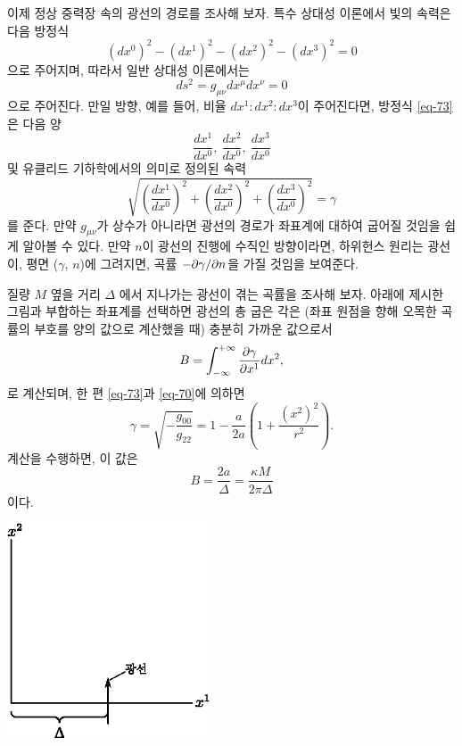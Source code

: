 \documentclass[b5paper]{article}
\begin{document}
이제 정상 중력장 속의 광선의 경로를 조사해 보자. 특수 상대성 이론에서 빛의 속력은 다음 방정식
\begin{equation*}
	\left(dx^0\right)^2-\left(dx^1\right)^2-\left(dx^2\right)^2-\left(dx^3\right)^2=0
\end{equation*}
으로 주어지며, 따라서 일반 상대성 이론에서는
\begin{equation} \label{eq-73}
	ds^2=g_{\mu\nu} dx^\mu dx^\nu = 0
\end{equation}
으로 주어진다. 만일 방향, 예를 들어, 비율 $dx^1 : dx^2 : dx^3$이 주어진다면, 방정식 \eqref{eq-73}은 다음 양
\begin{equation*}
	\frac{dx^1}{dx^0},~\frac{dx^2}{dx^0},~\frac{dx^3}{dx^0}
\end{equation*}
및 유클리드 기하학에서의 의미로 정의된 속력
\begin{equation*}
	\sqrt{\left(\frac{dx^1}{dx^0}\right)^2 + \left(\frac{dx^2}{dx^0}\right)^2 + \left(\frac{dx^3}{dx^0}\right)^2} =\gamma
\end{equation*}
를 준다. 만약 $g_{\mu\nu}$가 상수가 아니라면 광선의 경로가 좌표계에 대하여 굽어질 것임을 쉽게 알아볼 수 있다. 만약 $n$이 광선의 진행에 수직인 방향이라면, 하위헌스 원리는 광선이, 평면 ($\gamma$, $n$)에 그려지면, 곡률 $-{{{\partial}{\gamma}}/{{\partial}{n}}}$을 가질 것임을 보여준다.

질량 $M$ 옆을 거리 $\Delta$ 에서 지나가는 광선이 겪는  곡률을 조사해 보자. 아래에 제시한 그림과 부합하는 좌표계를 선택하면 광선의 총 굽은 각은 (좌표 원점을 향해 오목한 곡률의 부호를 양의 값으로 계산했을 때) 충분히 가까운 값으로서
\begin{equation*}
	B=\int_{-\infty}^{+\infty} {\frac{{\partial}{\gamma}}{{\partial}{x^1}}}dx^2,
\end{equation*}
로 계산되며, 한 편 \eqref{eq-73}과 \eqref{eq-70}에 의하면
\begin{equation*}
	\gamma=\sqrt{-\frac{g_{0 0}}{g_{2 2}}}=1-\frac{a}{2a}\left(1+\frac{\left(x^2\right)^2}{r^2}\right).
\end{equation*}
계산을 수행하면, 이 값은
\begin{equation} \label{eq-74}
	B=\frac{2a}{\Delta}=\frac{\kappa M}{2\pi\Delta}
\end{equation}
이다. 

\hfill \includegraphics[width=6cm]{Delta.eps}\hfill \,
\end{document}
